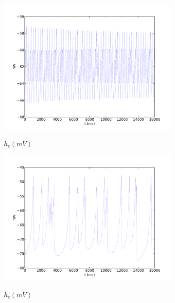 \documentclass[a4paper,12pt]{article}
\begin{document}
\begin{figure}
	\begin{subfigure}[b]{0.5\textwidth}
		\includegraphics[scale=0.35]{chosen-frontiers-2012/00143-1-1-6-he-thal.pdf}
		\label{fig:00143_a}
		\caption{$h_e (mV)$}
	\end{subfigure}
	\begin{subfigure}[b]{0.5\textwidth}
		\includegraphics[scale=0.35]{chosen-frontiers-2012/00143-1_2-1-6-he-thal.pdf}
		\label{fig:00143_b}
		\caption{$h_e (mV)$}
	\end{subfigure}
	\begin{subfigure}[b]{0.5\textwidth}

\end{subfigure}
\end{figure}
\end{document}
